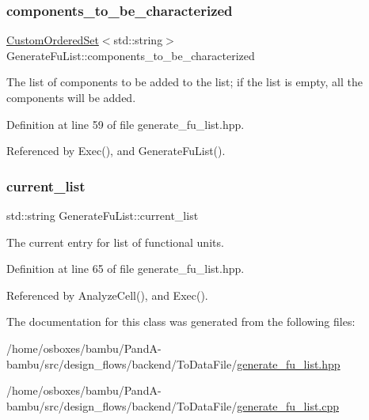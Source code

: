 \subsubsection{\texorpdfstring{components\+\_\+to\+\_\+be\+\_\+characterized}{components\_to\_be\_characterized}}
{\footnotesize\ttfamily \hyperlink{classCustomOrderedSet}{Custom\+Ordered\+Set}$<$std\+::string$>$ Generate\+Fu\+List\+::components\+\_\+to\+\_\+be\+\_\+characterized\hspace{0.3cm}{\ttfamily [private]}}



The list of components to be added to the list; if the list is empty, all the components will be added. 



Definition at line 59 of file generate\+\_\+fu\+\_\+list.\+hpp.



Referenced by Exec(), and Generate\+Fu\+List().

\mbox{\label{classGenerateFuList_a934ddfe617b1a07a2a87c2ae1c460580}} 
\subsubsection{\texorpdfstring{current\+\_\+list}{current\_list}}
{\footnotesize\ttfamily std\+::string Generate\+Fu\+List\+::current\+\_\+list\hspace{0.3cm}{\ttfamily [private]}}



The current entry for list of functional units. 



Definition at line 65 of file generate\+\_\+fu\+\_\+list.\+hpp.



Referenced by Analyze\+Cell(), and Exec().



The documentation for this class was generated from the following files\+:\begin{DoxyCompactItemize}
\item 
/home/osboxes/bambu/\+Pand\+A-\/bambu/src/design\+\_\+flows/backend/\+To\+Data\+File/\hyperlink{generate__fu__list_8hpp}{generate\+\_\+fu\+\_\+list.\+hpp}\item 
/home/osboxes/bambu/\+Pand\+A-\/bambu/src/design\+\_\+flows/backend/\+To\+Data\+File/\hyperlink{generate__fu__list_8cpp}{generate\+\_\+fu\+\_\+list.\+cpp}\end{DoxyCompactItemize}
